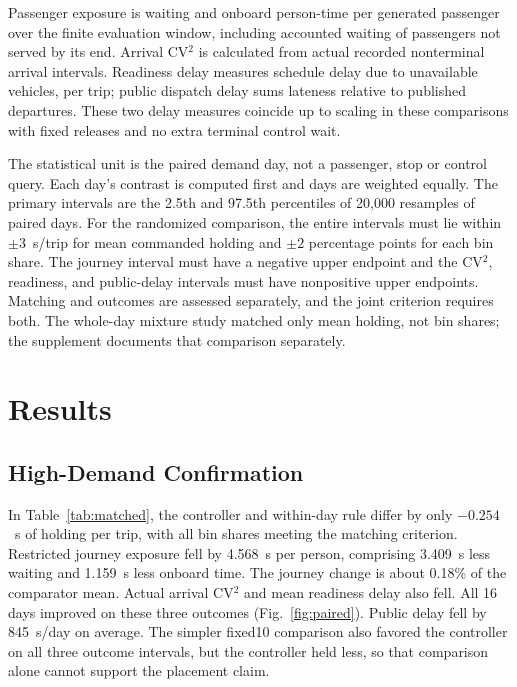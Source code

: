 \documentclass[journal]{IEEEtran}
\begin{document}
Passenger exposure is waiting and onboard person-time per generated passenger over the finite evaluation window, including accounted waiting of passengers not served by its end. Arrival CV$^2$ is calculated from actual recorded nonterminal arrival intervals. Readiness delay measures schedule delay due to unavailable vehicles, per trip; public dispatch delay sums lateness relative to published departures. These two delay measures coincide up to scaling in these comparisons with fixed releases and no extra terminal control wait.

The statistical unit is the paired demand day, not a passenger, stop or control query. Each day's contrast is computed first and days are weighted equally. The primary intervals are the 2.5th and 97.5th percentiles of 20,000 resamples of paired days. For the randomized comparison, the entire intervals must lie within $\pm3$~s/trip for mean commanded holding and $\pm2$ percentage points for each bin share. The journey interval must have a negative upper endpoint and the CV$^2$, readiness, and public-delay intervals must have nonpositive upper endpoints. Matching and outcomes are assessed separately, and the joint criterion requires both. The whole-day mixture study matched only mean holding, not bin shares; the supplement documents that comparison separately.

\section{Results}



\subsection{High-Demand Confirmation}
In Table~\ref{tab:matched}, the controller and within-day rule differ by only $-0.254$~s of holding per trip, with all bin shares meeting the matching criterion. Restricted journey exposure fell by 4.568~s per person, comprising 3.409~s less waiting and 1.159~s less onboard time. The journey change is about 0.18\% of the comparator mean. Actual arrival CV$^2$ and mean readiness delay also fell. All 16 days improved on these three outcomes (Fig.~\ref{fig:paired}). Public delay fell by 845~s/day on average. The simpler fixed10 comparison also favored the controller on all three outcome intervals, but the controller held less, so that comparison alone cannot support the placement claim.
\end{document}
